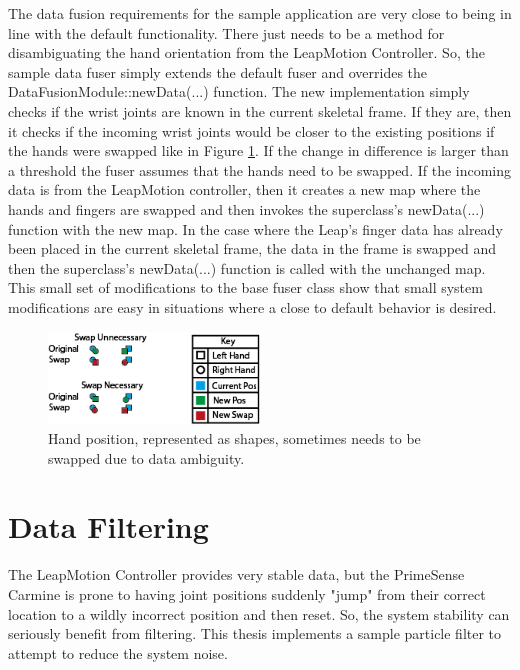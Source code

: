 The data fusion requirements for the sample application are very close to being in line with the default functionality. There just needs to be a method for disambiguating the hand orientation from the LeapMotion Controller. So, the sample data fuser simply extends the default fuser and overrides the DataFusionModule::newData(...) function. The new implementation simply checks if the wrist joints are known in the current skeletal frame. If they are, then it checks if the incoming wrist joints would be closer to the existing positions if the hands were swapped like in Figure \ref{fig:hand_swap}. If the change in difference is larger than a threshold the fuser assumes that the hands need to be swapped. If the incoming data is from the LeapMotion controller, then it creates a new map where the hands and fingers are swapped and then invokes the superclass's newData(...) function with the new map. In the case where the Leap's finger data has already been placed in the current skeletal frame, the data in the frame is swapped and then the superclass's newData(...) function is called with the unchanged map. This small set of modifications to the base fuser class show that small system modifications are easy in situations where a close to default behavior is desired.

\begin{figure}[]
\centering
\includegraphics[width=0.5\textwidth]{figures/handSwap}
\caption{Hand position, represented as shapes, sometimes needs to be swapped due to data ambiguity.}
\label{fig:hand_swap}
\end{figure}

\section{Data Filtering}

The LeapMotion Controller provides very stable data, but the PrimeSense Carmine is prone to having joint positions suddenly "jump" from their correct location to a wildly incorrect position and then reset. So, the system stability can seriously benefit from filtering. This thesis implements a sample particle filter to attempt to reduce the system noise.

